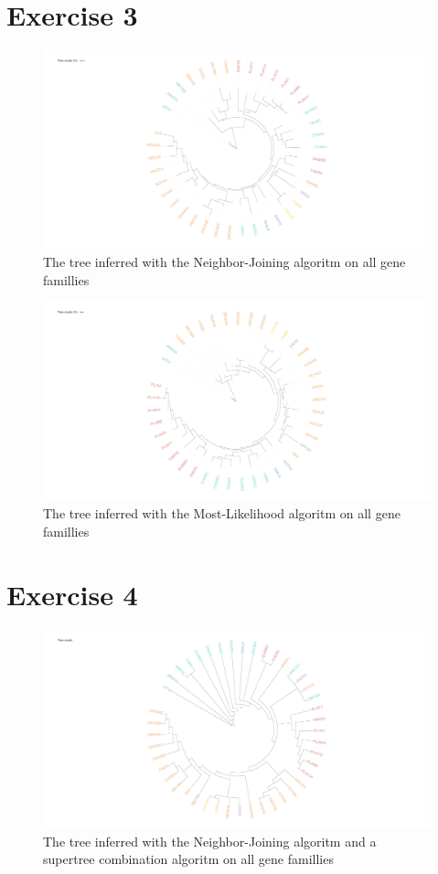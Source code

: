 \documentclass[]{article}
\theoremstyle{definition}
\begin{document}
\section{Exercise 3}

\begin{figure}[H]
	\includegraphics*[width = \linewidth]{image/Nj_ex3.pdf}
	\caption{ The tree inferred with the Neighbor-Joining algoritm on all gene famillies }
\end{figure}

\begin{figure}[H]
	\includegraphics*[width = \linewidth]{image/Ml_ex3.pdf}
	\caption{ The tree inferred with the Most-Likelihood algoritm on all gene famillies}
\end{figure}

\section{Exercise 4}

\begin{figure}[H]
	\includegraphics*[width = \linewidth]{image/NJ_supertree.pdf}
	\caption{ The tree inferred with the Neighbor-Joining algoritm and a supertree combination algoritm on all gene famillies }
\end{figure}
\end{document}
